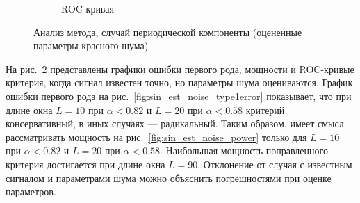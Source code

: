 \documentclass[specialist,
substylefile = spbu_report.rtx,
subf,href,colorlinks=true, 12pt]{disser}
\theoremstyle{definition}
\begin{document}
\begin{figure}[h]
\begin{subfigure}[t]{\textwidth}
		\caption{ROC-кривая}
		\label{fig:sin_est_noise_roc}
	\end{subfigure}
	\caption{Анализ метода, случай периодической компоненты (оцененные параметры красного шума)}
	\label{fig:sin_est_noise}
\end{figure}

На рис.~\ref{fig:sin_est_noise} представлены графики ошибки первого рода, мощности и ROC-кривые критерия, когда сигнал известен точно, но параметры шума оцениваются. График ошибки первого рода на рис.~\ref{fig:sin_est_noise_type1error} показывает, что при длине окна $L=10$ при $\alpha<0.82$ и $L=20$ при $\alpha<0.58$ критерий консервативный, в иных случаях --- радикальный. Таким образом, имеет смысл рассматривать мощность на рис.~\ref{fig:sin_est_noise_power} только для $L=10$ при $\alpha<0.82$ и $L=20$ при $\alpha<0.58$. Наибольшая мощность поправленного критерия достигается при длине окна $L=90$. Отклонение от случая с известным сигналом и параметрами шума можно объяснить погрешностями при оценке параметров.
\end{document}
